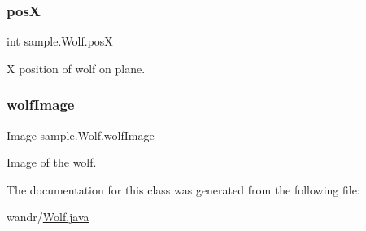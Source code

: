 \subsubsection{\texorpdfstring{posX}{posX}}
{\footnotesize\ttfamily int sample.\+Wolf.\+posX}

X position of wolf on plane. \mbox{\label{classsample_1_1_wolf_a4a4ab45cd25ee5287c2f9a80d6b00a75}} 
\subsubsection{\texorpdfstring{wolf\+Image}{wolfImage}}
{\footnotesize\ttfamily Image sample.\+Wolf.\+wolf\+Image}

Image of the wolf. 

The documentation for this class was generated from the following file\+:\begin{DoxyCompactItemize}
\item 
wandr/\hyperlink{_wolf_8java}{Wolf.\+java}\end{DoxyCompactItemize}
